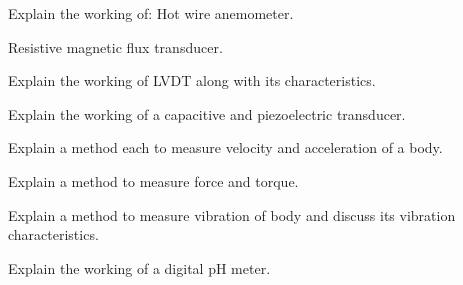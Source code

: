 \newpage \again

\item Explain the working of:
\iitem Hot wire anemometer.
\item Resistive magnetic flux transducer.
\ene\ene

\item \iitem Explain the working of LVDT along with its characteristics.
\Or
\item Explain the working of a capacitive and piezoelectric transducer.
\ene

\item \iitem Explain a method each to measure velocity and acceleration of a body.
\Or
\item Explain a method to measure force and torque.
\ene

\item \iitem Explain a method to measure vibration of body and discuss its vibration characteristics.
\Or
\item Explain the working of a digital pH meter.
\ene

\markC
\ene
